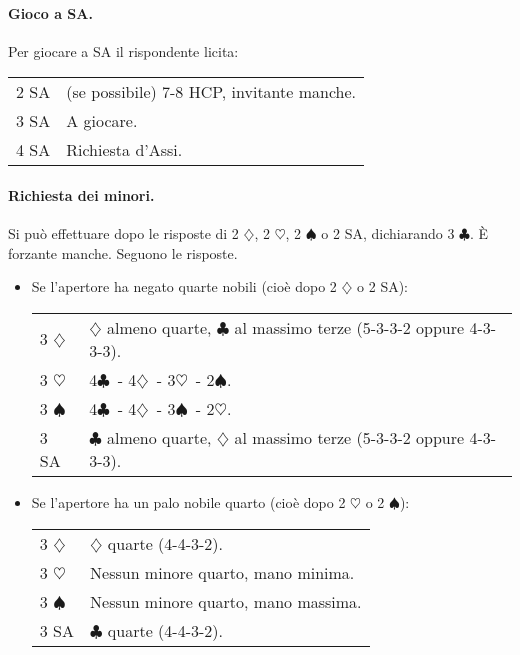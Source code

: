 \documentclass[a4paper,10pt]{article}
\renewcommand{\c}{$\clubsuit$\xspace}
\renewcommand{\d}{$\diamondsuit$\xspace}
\newcommand{\h}{$\heartsuit$\xspace}
\newcommand{\s}{$\spadesuit$\xspace}
\newcommand{\sa}{SA\xspace}
\newcommand{\smallspace}{\vskip0.3cm}
\newenvironment{twocol}
  {\smallspace\noindent\begin{tabular}{l p{0.78\textwidth}}}
  {\end{tabular}\smallspace}
\begin{document}
\paragraph{Gioco a SA.}
Per giocare a SA il rispondente licita:
\begin{twocol}
 2 \sa & (se possibile) 7-8 HCP, invitante manche.\\
 3 \sa & A giocare.\\
 4 \sa & Richiesta d'Assi.
\end{twocol}

\paragraph{Richiesta dei minori.} Si può effettuare dopo le risposte di 2 \d, 2 \h, 2 \s o 2 \sa, dichiarando 3 \c. È forzante manche. Seguono le risposte.

\begin{itemize}
 \item Se l'apertore ha negato quarte nobili (cioè dopo 2 \d o 2 \sa):
  \begin{twocol}
    3 \d & \d almeno quarte, \c al massimo terze (5-3-3-2 oppure 4-3-3-3).\\
    3 \h & 4\c\ - 4\d\ - 3\h\ - 2\s.\\
    3 \s & 4\c\ - 4\d\ - 3\s\ - 2\h.\\
    3 \sa & \c almeno quarte, \d al massimo terze (5-3-3-2 oppure 4-3-3-3).
  \end{twocol}

 \item Se l'apertore ha un palo nobile quarto (cioè dopo 2 \h o 2 \s):
  \begin{twocol}
    3 \d & \d quarte (4-4-3-2).\\
    3 \h & Nessun minore quarto, mano minima.\\
    3 \s & Nessun minore quarto, mano massima.\\
    3 \sa & \c quarte (4-4-3-2).
  \end{twocol}
\end{itemize}
\end{document}
